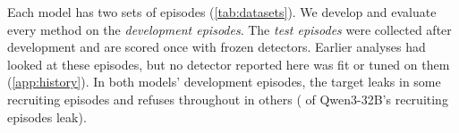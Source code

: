 Each model has two sets of episodes (\cref{tab:datasets}).
We develop and evaluate every method on the \emph{development episodes}.
The \emph{test episodes} were collected after development and are scored once with frozen detectors.
Earlier analyses had looked at these episodes, but no detector reported here was fit or tuned on them (\cref{app:history}).
In both models' development episodes, the target leaks in some recruiting episodes and refuses throughout in others (\qwenLeakRate{} of Qwen3-32B's recruiting episodes leak).

\begin{table}[t]
  \centering
  
  \caption{\textbf{The four datasets.} Every main-text number comes from exactly one of them. Columns give recruiting, control and target-alone episodes, scored calls, leaking calls, and episodes excluded before scoring. Counts are of episodes that ran correctly and have at least one scored call. Scored calls are those made after the target has read the secret, up to and including the call that leaks (\cref{app:data}).}
  \label{tab:datasets}
\end{table}
